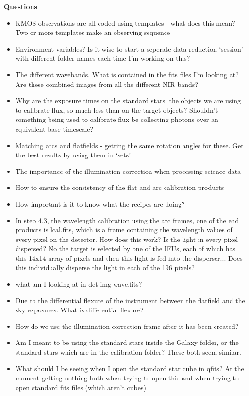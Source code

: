 \documentclass{literature}
\begin{document}
\textbf{Questions}
\begin{itemize}
	\item KMOS observations are all coded using templates - what does this mean? Two or more templates make an observing sequence
	\item Environment variables? Is it wise to start a seperate data reduction `session' with different folder names each time I'm working on this? 
	\item The different wavebands. What is contained in the fits files I'm looking at? Are these combined images from all the different NIR bands? 
	\item Why are the exposure times on the standard stars, the objects we are using to calibrate flux, so much less than on the target objects? Shouldn't something being used to calibrate flux be collecting photons over an equivalent base timescale? 
	\item Matching arcs and flatfields - getting the same rotation angles for these. Get the best results by using them in `sets' 
	\item The importance of the illumination correction when processing science data
	\item How to ensure the consistency of the flat and arc calibration products 
	\item How important is it to know what the recipes are doing?
	\item In step 4.3, the wavelength calibration using the arc frames, one of the end products is lcal.fits, which is a frame containing the wavelength values of every pixel on the detector. How does this work? Is the light in every pixel dispersed? No the target is selected by one of the IFUs, each of which has this 14x14 array of pixels and then this light is fed into the disperser... Does this individually disperse the light in each of the 196 pixels? 
	\item what am I looking at in det-img-wave.fits? 
	\item Due to the differential flexure of the instrument between the flatfield and the sky exposures. What is differential flexure? 
	\item How do we use the illumination correction frame after it has been created? 	
	\item Am I meant to be using the standard stars inside the Galaxy folder, or the standard stars which are in the calibration folder? These both seem similar. 
	\item What should I be seeing when I open the standard star cube in qfits? At the moment getting nothing both when trying to open this and when trying to open standard fits files (which aren't cubes)

\end{itemize}
\end{document}
